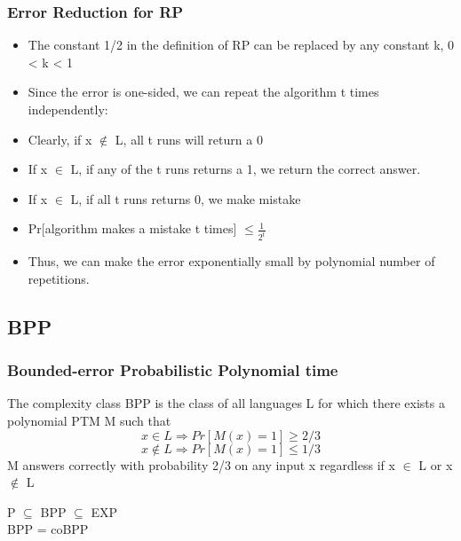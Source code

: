 \documentclass{beamer}
\begin{document}
\begin{frame}
\frametitle{Error Reduction for RP}
\begin{itemize}
	\item The constant 1/2 in the definition of RP can be replaced by any constant k, 0 < k < 1
	\item Since the error is one-sided, we can repeat the algorithm t times independently:
	\item Clearly, if x $\notin$ L, all t runs will return a 0
	\item If x $\in$ L, if any of the t runs returns a 1, we return the correct answer.
	\item If x $\in$ L, if all t runs returns 0, we make mistake
	\item Pr[algorithm makes a mistake t times] $\leq \frac{1}{2^{t}}$
	\item Thus, we can make the error exponentially small by polynomial number of repetitions.

\end{itemize}
\end{frame}
\subsection{BPP}
\begin{frame}
\frametitle{Bounded-error Probabilistic Polynomial time}
\begin{definition}[BPP]
	The complexity class BPP is the class of all languages L for which there exists a polynomial PTM M such that
	$$
	x \in L \Rightarrow Pr[M(x) = 1] \geq 2/3
	$$
	$$
	x \notin L \Rightarrow Pr[M(x) = 1] \leq 1/3
	$$
	M answers correctly with probability 2/3 on any input x regardless if x $\in$ L or x $\notin$ L
\end{definition}
P $\subseteq$ BPP $\subseteq$ EXP\\
BPP = coBPP\\
\end{frame}
\end{document}
